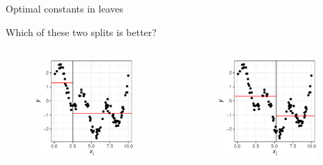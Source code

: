 \documentclass[11pt,compress,t,notes=noshow, xcolor=table]{beamer}
\begin{document}
\begin{vbframe}{Optimal constants in leaves}

Which of these two splits is better?

\begin{columns}
\begin{column}{0.5\textwidth}

\color{fgcolor}

\begin{figure}
\includegraphics[width=0.9\textwidth]{figure/splitcrit_optimal-constant-sub1.pdf} 
\end{figure}

 
\end{column}
\begin{column}{0.5\textwidth}

\begin{figure}
\includegraphics[width=0.9\textwidth]{figure/splitcrit_optimal-constant-sub2.pdf} 
\end{figure}


\end{column}
\end{columns}
\end{vbframe}
\end{document}

